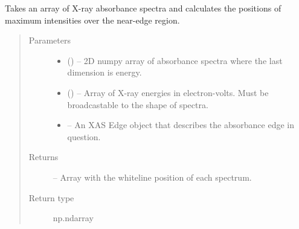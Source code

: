 \documentclass[letterpaper,10pt,english]{sphinxmanual}
\begin{document}
\begin{fulllineitems}
\label{\detokenize{xanespy:xanespy.xanes_math.direct_whitelines}}
Takes an array of X-ray absorbance spectra and calculates the
positions of maximum intensities over the near-edge region.
\begin{quote}\begin{description}
\item[{Parameters}] \leavevmode\begin{itemize}
\item {} 
 () -- 2D numpy array of absorbance spectra where the last dimension is
energy.

\item {} 
 () -- Array of X-ray energies in electron-volts. Must be broadcastable
to the shape of spectra.

\item {} 
 -- An XAS Edge object that describes the absorbance edge in
question.

\end{itemize}

\item[{Returns}] \leavevmode
{} -- Array with the whiteline position of each spectrum.

\item[{Return type}] \leavevmode
np.ndarray

\end{description}\end{quote}

\end{fulllineitems}

\end{document}
